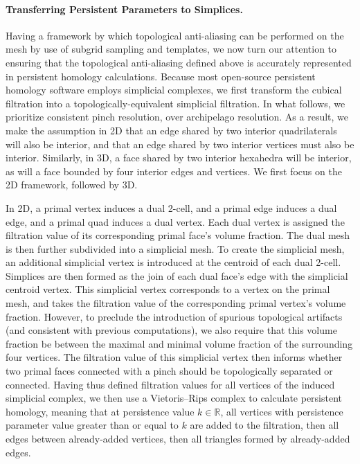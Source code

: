 \paragraph{Transferring Persistent Parameters to Simplices.}
Having a framework by which topological anti-aliasing can be performed on the mesh by use of subgrid sampling and templates, we now turn our attention to ensuring that the topological anti-aliasing defined above is accurately represented in persistent homology calculations.
Because most open-source persistent homology software employs simplicial complexes, we first 
transform the cubical filtration into a topologically-equivalent simplicial filtration.
In what follows, we prioritize consistent pinch resolution, over archipelago resolution.
As a result, we make the assumption in 2D that an edge shared by two interior quadrilaterals will also be interior, and that an edge shared by two interior vertices must also be interior.
Similarly, in 3D, a face shared by two interior hexahedra will be interior, as will a face bounded by four interior edges and vertices.
We first focus on the 2D framework, followed by 3D.

In 2D, a primal vertex induces a dual 2-cell, and a primal edge induces a dual edge, and a primal quad induces a dual vertex.
Each dual vertex is assigned the filtration value of its corresponding primal face's volume fraction.
The dual mesh is then further subdivided into a simplicial mesh.
To create the simplicial mesh, an additional simplicial vertex is introduced at the centroid of each dual 2-cell. 
Simplices are then formed as the join of each dual face's edge with the simplicial centroid vertex.
This simplicial vertex corresponds to a vertex on the primal mesh, and takes the filtration value of the corresponding primal vertex's volume fraction.
However, to preclude the introduction of spurious topological artifacts (and consistent with previous computations), we also require that this volume fraction be between the maximal and minimal volume fraction of the surrounding four vertices.
The filtration value of this simplicial vertex then informs whether two primal faces connected with a pinch should be topologically separated or connected.
Having thus defined filtration values for all vertices of the induced simplicial complex, we then use a Vietoris–Rips complex to calculate persistent homology, meaning that 
at persistence value $k \in \mathbb{R}$, all vertices with persistence parameter value greater than or equal to $k$ are added to the filtration, then all edges between already-added vertices, then all triangles formed by already-added edges.


